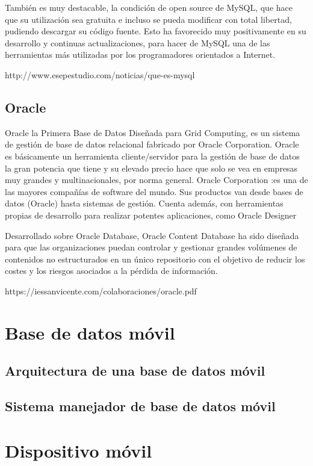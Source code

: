 También es muy destacable, la condición de open source de MySQL, que hace que su utilización sea gratuita e incluso se pueda modificar con total libertad, pudiendo descargar su código fuente. Esto ha favorecido muy positivamente en su desarrollo y continuas actualizaciones, para hacer de MySQL una de las herramientas más utilizadas por los programadores orientados a Internet.

http://www.esepestudio.com/noticias/que-es-mysql

\subsection{Oracle}

Oracle la Primera Base de Datos Diseñada para Grid Computing, es un sistema de gestión de base de datos relacional fabricado por Oracle Corporation. Oracle es básicamente un herramienta cliente/servidor para la gestión de base de datos la gran potencia que tiene y su elevado precio hace que solo se vea en empresas muy grandes y multinacionales, por norma general. Oracle Corporation :es una de las mayores compañías de software del mundo. Sus productos van desde bases de datos (Oracle) hasta sistemas de gestión. Cuenta además, con herramientas propias de desarrollo para realizar potentes aplicaciones, como Oracle Designer

Desarrollado sobre Oracle Database, Oracle Content Database ha sido diseñada para que las organizaciones puedan controlar y gestionar grandes volúmenes de contenidos no estructurados en un único repositorio con el objetivo de reducir los costes y los riesgos asociados a la pérdida de información.

https://iessanvicente.com/colaboraciones/oracle.pdf

\section{Base de datos móvil} 		

\subsection{Arquitectura de una base de datos móvil} 

\subsection{Sistema manejador de base de datos móvil} 


\section{Dispositivo móvil}

